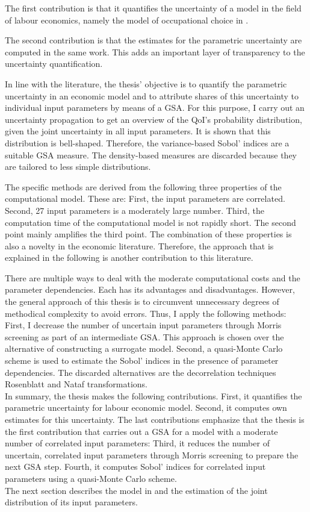 The first contribution is that it quantifies the uncertainty of a model in the field of labour economics, namely the model of occupational choice in \cite{Keane.1994}.

The second contribution is that the estimates for the parametric uncertainty are computed in the same work. This adds an important layer of transparency to the uncertainty quantification.

In line with the literature, the thesis' objective is to quantify the parametric uncertainty in an economic model and to attribute shares of this uncertainty to individual input parameters by means of a GSA. For this purpose, I carry out an uncertainty propagation to get an overview of the QoI's probability distribution, given the joint uncertainty in all input parameters. It is shown that this distribution is bell-shaped. Therefore, the variance-based Sobol' indices are a suitable GSA measure. The density-based measures are discarded because they are tailored to less simple distributions.

The specific methods are derived from the following three properties of the computational model. These are: First, the input parameters are correlated. Second, 27 input parameters is a moderately large number. Third, the computation time of the computational model is not rapidly short. The second point mainly amplifies the third point. The combination of these properties is also a novelty in the economic literature. Therefore, the approach that is explained in the following is another contribution to this literature.

There are multiple ways to deal with the moderate computational costs and the parameter dependencies. Each has its advantages and disadvantages. However, the general approach of this thesis is to circumvent unnecessary degrees of methodical complexity to avoid errors. Thus, I apply the following methods: First, I decrease the number of uncertain input parameters through Morris screening as part of an intermediate GSA. This approach is chosen over the alternative of constructing a surrogate model.
Second, a quasi-Monte Carlo scheme is used to estimate the Sobol' indices in the presence of parameter dependencies. The discarded alternatives are the decorrelation techniques Rosenblatt and Nataf transformations.\\
\newline
In summary, the thesis makes the following contributions. First, it quantifies the parametric uncertainty for labour economic model. Second, it computes own estimates for this uncertainty. The last contributions emphasize that the thesis is the first contribution that carries out a GSA for a model with a moderate number of correlated input parameters: Third, it reduces the number of uncertain, correlated input parameters through Morris screening to prepare the next GSA step. Fourth, it computes Sobol' indices for correlated input parameters using a quasi-Monte Carlo scheme.\\
\newline
The next section describes the model in \cite{Keane.1994} and the estimation of the joint distribution of its input parameters.
